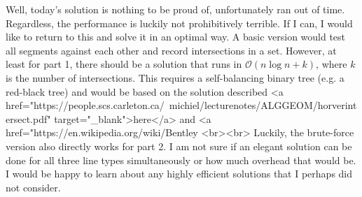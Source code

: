 Well, today's solution is nothing to be proud of, unfortunately ran out of time. Regardless, the performance is luckily not prohibitively terrible. If I can, I would like to return to this and solve it in an optimal way. A basic version would test all segments against each other and record intersections in a set. However, at least for part 1, there should be a solution that runs in $\mathcal{O}(n \log n + k)$, where $k$ is the number of intersections. This requires a self-balancing binary tree (e.g. a red-black tree) and would be based on the solution described <a href="https://people.scs.carleton.ca/~michiel/lecturenotes/ALGGEOM/horverintersect.pdf" target="_blank">here</a> and <a href="https://en.wikipedia.org/wiki/Bentley%
<br><br>
Luckily, the brute-force version also directly works for part 2. I am not sure if an elegant solution can be done for all three line types simultaneously or how much overhead that would be. I would be happy to learn about any highly efficient solutions that I perhaps did not consider.